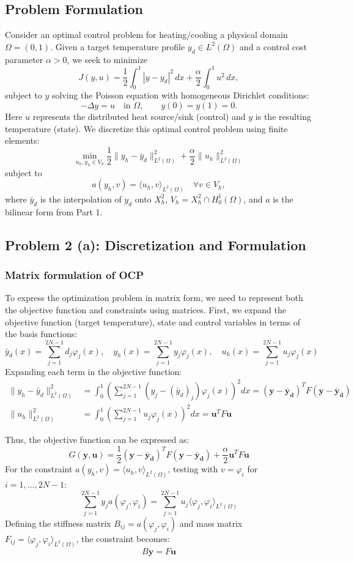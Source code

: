 \documentclass[a4paper,10pt]{article}
\begin{document}
\subsection*{Problem Formulation}
Consider an optimal control problem for heating/cooling a physical domain \(\Omega=(0,1)\).
Given a target temperature profile \(y_d \in L^2(\Omega)\) and a control cost parameter \(\alpha > 0\), we seek to minimize
\[
	J(y,u) = \frac{1}{2}\int_0^1 |y-y_d|^2\,dx + \frac{\alpha}{2}\int_0^1 u^2\,dx,
\]
subject to \(y\) solving the Poisson equation with homogeneous Dirichlet conditions:
\[
	-\Delta y = u \quad\text{in }\Omega, \qquad y(0) = y(1) = 0.
\]
Here \(u\) represents the distributed heat source/sink (control) and \(y\) is the resulting temperature (state).
We discretize this optimal control problem using finite elements:
\[
	\min_{u_h,y_h\in V_h} \frac{1}{2}\|y_h - \bar{y}_d\|^2_{L^2(\Omega)} + \frac{\alpha}{2}\|u_h\|^2_{L^2(\Omega)}
\]
subject to
\[
	a(y_h,v) = \langle u_h,v \rangle_{L^2(\Omega)} \quad \forall v\in V_h,
\]
where \(\bar{y}_d\) is the interpolation of \(y_d\) onto \(X^2_h\), \(V_h = X^2_h \cap H^1_0(\Omega)\), and \(a\) is the bilinear form from Part 1.
\subsection*{Problem 2 (a): Discretization and Formulation}
\subsubsection*{Matrix formulation of OCP}
To express the optimization problem in matrix form, we need to represent both the objective function and constraints using matrices.
First, we expand the objective function (target temperature), state and control variables in terms of the basis functions:
\[
	\bar{y}_d(x) = \sum_{j=1}^{2N-1} d_j \varphi_j(x), \quad
	y_h(x) = \sum_{j=1}^{2N-1} y_j \varphi_j(x), \quad
	u_h(x) = \sum_{j=1}^{2N-1} u_j \varphi_j(x)
\]
Expanding each term in the objective function:
\begin{align*}
	\|y_h - \bar{y}_d\|^2_{L^2(\Omega)} & = \int_0^1 \left(\sum_{j=1}^{2N-1} (y_j-(\bar{y}_d)_j)\varphi_j(x)\right)^2 dx = (\mathbf{y}-\mathbf{\bar{y}_d})^T F (\mathbf{y}-\mathbf{\bar{y}_d}) \\
	\|u_h\|^2_{L^2(\Omega)}             & = \int_0^1 \left(\sum_{j=1}^{2N-1} u_j \varphi_j(x)\right)^2 dx = \mathbf{u}^T F \mathbf{u}
\end{align*}

Thus, the objective function can be expressed as:
\[
	G(\mathbf{y},\mathbf{u}) = \frac{1}{2}(\mathbf{y}-\mathbf{\bar{y}_d})^T F (\mathbf{y}-\mathbf{\bar{y}_d}) + \frac{\alpha}{2} \mathbf{u}^T F \mathbf{u}
\]
For the constraint \(a(y_h,v) = \langle u_h,v \rangle_{L^2(\Omega)}\), testing with \(v = \varphi_i\) for \(i=1,\dots,2N-1\):
\[
	\sum_{j=1}^{2N-1} y_j a(\varphi_j,\varphi_i) = \sum_{j=1}^{2N-1} u_j \langle \varphi_j,\varphi_i \rangle_{L^2(\Omega)}
\]
Defining the stiffness matrix \(B_{ij} = a(\varphi_j,\varphi_i)\) and mass matrix \(F_{ij} = \langle \varphi_j,\varphi_i \rangle_{L^2(\Omega)}\), the constraint becomes:
\[
	B \mathbf{y} = F \mathbf{u}
\]
\end{document}
